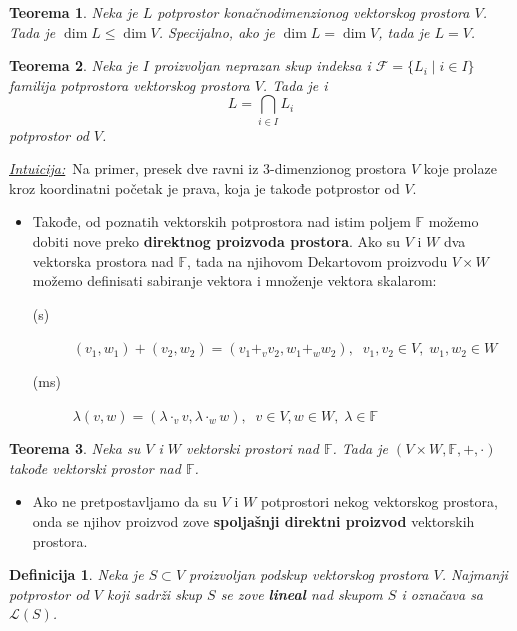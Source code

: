 \documentclass[a4paper,12pt,twoside]{report}
\newtheorem{theorem}{Teorema}[section]
\newtheorem{definition}{Definicija}[section]
\numberwithin{algorithm}{section}
\newcommand{\intuicija}{\noindent\underline{\textit{Intuicija:}}\ }
\begin{document}
\begin{theorem}
    Neka je $L$ potprostor konačnodimenzionog vektorskog prostora $V$. Tada je $\dim L \leq \dim V$. Specijalno, ako je 
    $\dim L = \dim V$, tada je $L = V$.
\end{theorem}

\begin{theorem}
    Neka je $I$ proizvoljan neprazan skup indeksa i $\mathcal{F} = \{L_i\;|\; i \in I\}$ familija potprostora vektorskog prostora $V$. Tada je i \[L = \bigcap_{i \in I}L_i\]
    potprostor od $V$.
\end{theorem}

\intuicija Na primer, presek dve ravni iz 3-dimenzionog prostora $V$ koje prolaze kroz koordinatni početak je prava, koja je takođe potprostor od $V$.

\begin{itemize}
    \item Takođe, od poznatih vektorskih potprostora nad istim poljem $\mathbb{F}$ možemo dobiti nove preko \textbf{direktnog
    proizvoda prostora}. Ako su $V$ i $W$ dva vektorska prostora nad $\mathbb{F}$, tada na njihovom Dekartovom proizvodu $V \times W$
    možemo definisati sabiranje vektora i množenje vektora skalarom:
    \begin{description}
        \item[(s)] $(v_1, w_1) + (v_2, w_2) = (v_1 +_v v_2, w_1 +_w w_2), \;\; v_1, v_2 \in V, \; w_1, w_2 \in W$
        \item[(ms)] $\lambda(v, w) = (\lambda \cdot_v v, \lambda \cdot_w w), \;\; v \in V, w \in W, \; \lambda \in \mathbb{F}$
    \end{description}
\end{itemize}

\begin{theorem}
    Neka su $V$ i $W$ vektorski prostori nad $\mathbb{F}$. Tada je $(V \times W, \mathbb{F}, +, \cdot)$ takođe vektorski prostor
    nad $\mathbb{F}$.
\end{theorem}

\begin{itemize}
    \item Ako ne pretpostavljamo da su $V$ i $W$ potprostori nekog vektorskog prostora, onda se njihov proizvod zove 
    \textbf{spoljašnji direktni proizvod} vektorskih prostora.
\end{itemize}

\begin{definition}
    Neka je $S \subset V$ proizvoljan podskup vektorskog prostora $V$. Najmanji potprostor od $V$ koji sadrži skup $S$
    se zove \textbf{lineal} nad skupom $S$ i označava sa $\mathcal{L}(S)$.
\end{definition}
\end{document}
